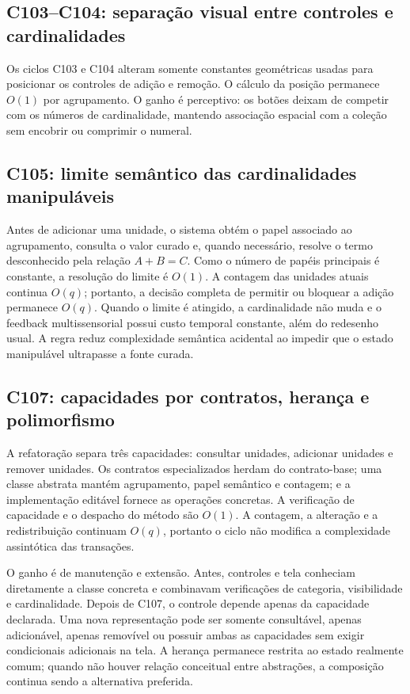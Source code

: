 \documentclass[12pt,a4paper]{article}
\begin{document}
\subsection{C103--C104: separação visual entre controles e cardinalidades}
Os ciclos C103 e C104 alteram somente constantes geométricas usadas para posicionar os controles de adição e remoção. O cálculo da posição permanece $O(1)$ por agrupamento. O ganho é perceptivo: os botões deixam de competir com os números de cardinalidade, mantendo associação espacial com a coleção sem encobrir ou comprimir o numeral.

\subsection{C105: limite semântico das cardinalidades manipuláveis}
Antes de adicionar uma unidade, o sistema obtém o papel associado ao agrupamento, consulta o valor curado e, quando necessário, resolve o termo desconhecido pela relação $A+B=C$. Como o número de papéis principais é constante, a resolução do limite é $O(1)$. A contagem das unidades atuais continua $O(q)$; portanto, a decisão completa de permitir ou bloquear a adição permanece $O(q)$. Quando o limite é atingido, a cardinalidade não muda e o feedback multissensorial possui custo temporal constante, além do redesenho usual. A regra reduz complexidade semântica acidental ao impedir que o estado manipulável ultrapasse a fonte curada.

\subsection{C107: capacidades por contratos, herança e polimorfismo}
A refatoração separa três capacidades: consultar unidades, adicionar unidades e remover unidades. Os contratos especializados herdam do contrato-base; uma classe abstrata mantém agrupamento, papel semântico e contagem; e a implementação editável fornece as operações concretas. A verificação de capacidade e o despacho do método são $O(1)$. A contagem, a alteração e a redistribuição continuam $O(q)$, portanto o ciclo não modifica a complexidade assintótica das transações.

O ganho é de manutenção e extensão. Antes, controles e tela conheciam diretamente a classe concreta e combinavam verificações de categoria, visibilidade e cardinalidade. Depois de C107, o controle depende apenas da capacidade declarada. Uma nova representação pode ser somente consultável, apenas adicionável, apenas removível ou possuir ambas as capacidades sem exigir condicionais adicionais na tela. A herança permanece restrita ao estado realmente comum; quando não houver relação conceitual entre abstrações, a composição continua sendo a alternativa preferida.
\end{document}

